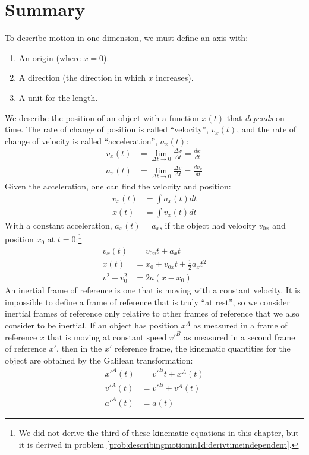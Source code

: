 \newpage
\section{Summary}
\vspace{0.25cm}
\begin{chapterSummary}
To describe motion in one dimension, we must define an axis with:
\begin{enumerate}
\item An origin (where $x=0$).
\item A direction (the direction in which $x$ increases).
\item A unit for the length.
\end{enumerate}
We describe the position of an object with a function $x(t)$ that \textit{depends} on time. The rate of change of position is called ``velocity'', $v_x(t)$, and the rate of change of velocity is called ``acceleration'', $a_x(t)$:
\begin{align*}
v_x(t)&=\lim_{\Delta t\to 0}\frac{\Delta x}{\Delta t}=\frac{dx}{dt}\\
a_x(t)&=\lim_{\Delta t\to 0}\frac{\Delta v}{\Delta t}=\frac{dv_x}{dt}
\end{align*}
Given the acceleration, one can find the velocity and position:
\begin{align*}
v_x(t)&=\int a_x(t)dt\\
x(t)&=\int v_x(t)dt
\end{align*}
With a constant acceleration, $a_x(t)=a_x$, if the object had velocity $v_{0x}$ and position $x_0$ at $t=0$:\footnote{We did not derive the third of these kinematic equations in this chapter, but it is derived in problem \ref{prob:describingmotionin1d:derivtimeindependent}.} 
\begin{align*}
v_x(t)&=v_{0x}t+a_xt\\
x(t)&=x_0+v_{0x}t+\frac{1}{2}a_xt^2\\
v^2-v_0^2&=2a(x-x_0) 
\end{align*}
An inertial frame of reference is one that is moving with a constant velocity. It is impossible to define a frame of reference that is truly ``at rest'', so we consider inertial frames of reference only relative to other frames of reference that we also consider to be inertial. If an object has position $x^A$ as measured in a frame of reference $x$ that is moving at constant speed $v'^B$ as measured in a second frame of reference $x'$, then in the $x'$ reference frame, the kinematic quantities for the object are obtained by the Galilean transformation:
\begin{align*}
x'^A(t) &= v'^Bt + x^A(t)\\
v'^A(t) &=v'^B+v^A(t)\\
a'^A(t) &= a(t)
\end{align*}
\end{chapterSummary}


